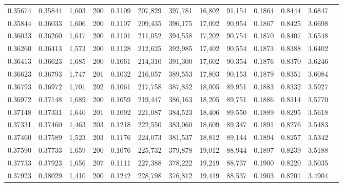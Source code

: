 \begin{tabular}{rrrrrrrrrrrrr}
0.35674 & 0.35844 & 1,603 & 200 &                                     0.1109 & 207,829 & 397,781 &  16,802 &  91,154 & 0.1864 & 0.8444 & 3.6847 \\
0.35844 & 0.36033 & 1,606 & 200 &                                     0.1107 & 209,435 & 396,175 &  17,002 &  90,954 & 0.1867 & 0.8425 & 3.6698 \\
0.36033 & 0.36260 & 1,617 & 200 &                                     0.1101 & 211,052 & 394,558 &  17,202 &  90,754 & 0.1870 & 0.8407 & 3.6548 \\
0.36260 & 0.36413 & 1,573 & 200 &                                     0.1128 & 212,625 & 392,985 &  17,402 &  90,554 & 0.1873 & 0.8388 & 3.6402 \\
0.36413 & 0.36623 & 1,685 & 200 &                                     0.1061 & 214,310 & 391,300 &  17,602 &  90,354 & 0.1876 & 0.8370 & 3.6246 \\
0.36623 & 0.36793 & 1,747 & 201 &                                     0.1032 & 216,057 & 389,553 &  17,803 &  90,153 & 0.1879 & 0.8351 & 3.6084 \\
0.36793 & 0.36972 & 1,701 & 202 &                                     0.1061 & 217,758 & 387,852 &  18,005 &  89,951 & 0.1883 & 0.8332 & 3.5927 \\
0.36972 & 0.37148 & 1,689 & 200 &                                     0.1059 & 219,447 & 386,163 &  18,205 &  89,751 & 0.1886 & 0.8314 & 3.5770 \\
0.37148 & 0.37331 & 1,640 & 201 &                                     0.1092 & 221,087 & 384,523 &  18,406 &  89,550 & 0.1889 & 0.8295 & 3.5618 \\
0.37331 & 0.37460 & 1,463 & 203 &                                     0.1218 & 222,550 & 383,060 &  18,609 &  89,347 & 0.1891 & 0.8276 & 3.5483 \\
0.37460 & 0.37589 & 1,523 & 203 &                                     0.1176 & 224,073 & 381,537 &  18,812 &  89,144 & 0.1894 & 0.8257 & 3.5342 \\
0.37590 & 0.37733 & 1,659 & 200 &                                     0.1076 & 225,732 & 379,878 &  19,012 &  88,944 & 0.1897 & 0.8239 & 3.5188 \\
0.37733 & 0.37923 & 1,656 & 207 &                                     0.1111 & 227,388 & 378,222 &  19,219 &  88,737 & 0.1900 & 0.8220 & 3.5035 \\
0.37923 & 0.38029 & 1,410 & 200 &                                     0.1242 & 228,798 & 376,812 &  19,419 &  88,537 & 0.1903 & 0.8201 & 3.4904 \\

\end{tabular}
